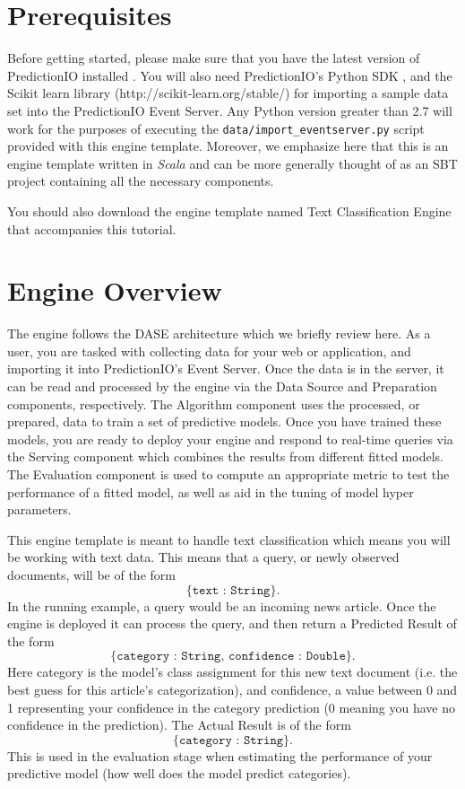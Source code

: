 \documentclass[a4paper,12pt]{article}
\renewcommand{\it}[1]{\textit{#1}}
\renewcommand{\tt}[1]{\texttt{#1}}
\newcommand{\3}{\left}
\newcommand{\4}{\right}
\renewcommand{\-}[1]{{}^{-#1}}
\begin{document}
\section*{Prerequisites}

Before getting started, please make sure that you have the latest version of PredictionIO installed 
. You will also need PredictionIO's Python SDK 
, and the Scikit learn library (http://scikit-learn.org/stable/) for importing a sample data set into the PredictionIO Event Server. Any Python version greater than 2.7 will work for the purposes of executing the \tt{data/import\_eventserver.py} script provided with this engine template. Moreover, we emphasize here that this is an engine template written in \it{Scala} and can be more generally thought of as an SBT project containing all the necessary components.

You should also download the engine template named Text Classification Engine 
 that accompanies this tutorial.

\section*{Engine Overview}

The engine follows the DASE architecture which we briefly review here. As a user, you are tasked with collecting data for your web or application, and importing it into PredictionIO's Event Server. Once the data is in the server, it  can be read and processed by the engine via the Data Source and Preparation components, respectively. The Algorithm component uses the processed, or prepared, data to train a set of predictive models. Once you have trained these models, you are ready to deploy your engine and respond to real-time queries via the Serving component which combines the results from different fitted models. The Evaluation component is used to compute an appropriate metric to test the performance of a fitted model, as well as aid in the tuning of model hyper parameters. 

This engine template is meant to handle text classification which means you will be working with text data. This means that a query, or newly observed documents, will be of the form
$$
\tt{\{text : String\}}.
$$
In the running example, a query would be an incoming news article. Once the engine is deployed it can process the query, and then return a Predicted Result of the form 
$$
\tt{\{category : String, confidence : Double\}}.
$$
Here category is the model's class assignment for this new text document (i.e. the best guess for this article's categorization), and confidence, a value between 0 and 1 representing your confidence in the category prediction (0 meaning you have no confidence in the prediction). The Actual Result is of the form 
$$
\tt{\{category : String\}}.
$$
This is used in the evaluation stage when estimating the performance of your predictive model (how well does the model predict categories). 
 
\end{document}
